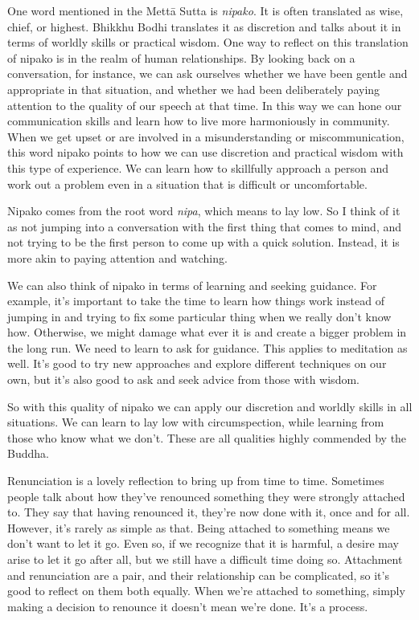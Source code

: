 
One word mentioned in the Mettā Sutta is \emph{nipako}. It is often 
translated as wise, chief, or highest. Bhikkhu Bodhi translates it as 
discretion and talks about it in terms of worldly skills or practical 
wisdom. One way to reflect on this translation of nipako is in the 
realm of human relationships. By looking back on a conversation, for 
instance, we can ask ourselves whether we have been gentle and 
appropriate in that situation, and whether we had been deliberately 
paying attention to the quality of our speech at that time. In this way 
we can hone our communication skills and learn how to live more 
harmoniously in community. When we get upset or are involved in a 
misunderstanding or miscommunication, this word nipako points to how we 
can use discretion and practical wisdom with this type of experience. 
We can learn how to skillfully approach a person and work out a problem 
even in a situation that is difficult or uncomfortable.

Nipako comes from the root word \emph{nipa}, which means to lay low. So 
I think of it as not jumping into a conversation with the first thing 
that comes to mind, and not trying to be the first person to come up 
with a quick solution. Instead, it is more akin to paying attention and 
watching.

We can also think of nipako in terms of learning and seeking guidance. 
For example, it's important to take the time to learn how things work 
instead of jumping in and trying to fix some particular thing when we 
really don't know how. Otherwise, we might damage what ever it is and 
create a bigger problem in the long run. We need to learn to ask for 
guidance. This applies to meditation as well. It's good to try new 
approaches and explore different techniques on our own, but it's also 
good to ask and seek advice from those with wisdom.

So with this quality of nipako we can apply our discretion and worldly 
skills in all situations. We can learn to lay low with circumspection, 
while learning from those who know what we don't. These are all 
qualities highly commended by the Buddha.


Renunciation is a lovely reflection to bring up from time to time. 
Sometimes people talk about how they've renounced something they were 
strongly attached to. They say that having renounced it, they're now 
done with it, once and for all. However, it's rarely as simple as that. 
Being attached to something means we don't want to let it go. Even so, 
if we recognize that it is harmful, a desire may arise to let it go 
after all, but we still have a difficult time doing so. Attachment and 
renunciation are a pair, and their relationship can be complicated, so 
it's good to reflect on them both equally. When we're attached to 
something, simply making a decision to renounce it doesn't mean we're 
done. It's a process.


